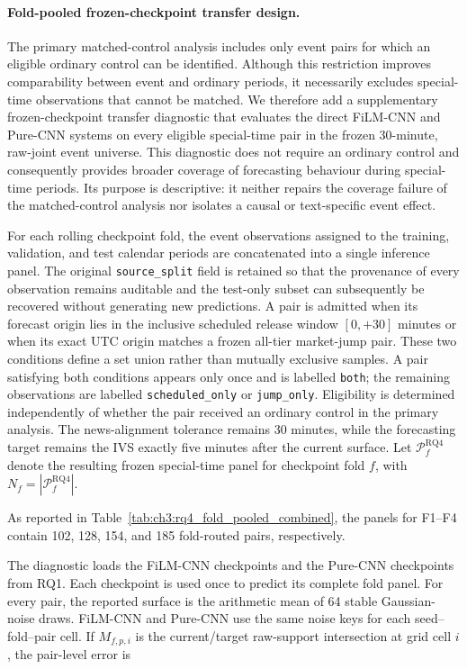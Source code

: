 \paragraph*{Fold-pooled frozen-checkpoint transfer design.}
The primary matched-control analysis includes only event pairs for which an
eligible ordinary control can be identified.  Although this restriction
improves comparability between event and ordinary periods, it necessarily
excludes special-time observations that cannot be matched.  We therefore add
a supplementary frozen-checkpoint transfer diagnostic that evaluates the
direct FiLM-CNN and Pure-CNN systems on every eligible special-time pair
in the frozen 30-minute, raw-joint event universe.  This diagnostic does not
require an ordinary control and consequently provides broader coverage of
forecasting behaviour during special-time periods.  Its purpose is
descriptive: it neither repairs the coverage failure of the matched-control
analysis nor isolates a causal or text-specific event effect.


For each rolling checkpoint fold, the event observations assigned to the
training, validation, and test calendar periods are concatenated into a single
inference panel.  The original \texttt{source\_split} field is retained so
that the provenance of every observation remains auditable and the test-only
subset can subsequently be recovered without generating new predictions.  A
pair is admitted when its forecast origin lies in the inclusive scheduled
release window $[0,+30]$ minutes or when its exact UTC origin matches a frozen
all-tier market-jump pair.  These two conditions define a set union rather
than mutually exclusive samples.  A pair satisfying both conditions appears
only once and is labelled \texttt{both}; the remaining observations are
labelled \texttt{scheduled\_only} or \texttt{jump\_only}.  Eligibility is
determined independently of whether the pair received an ordinary control in
the primary analysis.  The news-alignment tolerance remains 30 minutes, while
the forecasting target remains the IVS exactly five minutes after the current
surface.  Let $\mathcal{P}^{\mathrm{RQ4}}_f$ denote the resulting frozen
special-time panel for checkpoint fold $f$, with
$N_f=|\mathcal{P}^{\mathrm{RQ4}}_f|$.

As reported in Table~\ref{tab:ch3:rq4_fold_pooled_combined}, the panels for F1--F4 contain 102, 128, 154, and 185 fold-routed pairs, respectively.


The diagnostic loads the FiLM-CNN checkpoints and the
Pure-CNN checkpoints from RQ1.  Each checkpoint is used
once to predict its complete fold panel.  For every pair, the reported surface
is the arithmetic mean of 64 stable Gaussian-noise draws.  FiLM-CNN and
Pure-CNN use the same noise keys for each seed--fold--pair cell.  If
$M_{f,p,i}$ is the current/target raw-support intersection at grid cell $i$,
the pair-level error is


